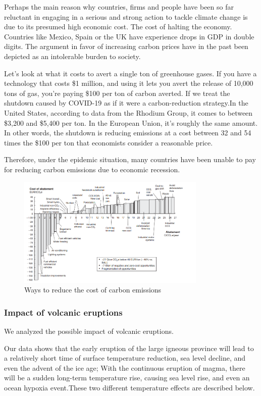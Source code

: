 \documentclass{apmcmthesis}
\begin{document}
Perhaps the main reason why countries, firms and people have been so far reluctant in engaging in a serious and strong action to tackle climate change is due to its presumed high economic cost. The cost of halting the economy. Countries like Mexico, Spain or the UK have experience drops in GDP in double digits. The argument in favor of increasing carbon prices have in the past been depicted as an intolerable burden to society. 

 Let’s look at what it costs to avert a single ton of greenhouse gases\cite{cost}. If you have a technology that costs \$1 million, and using it lets you avert the release of 10,000 tons of gas, you’re paying \$100 per ton of carbon averted. 
If we treat the shutdown caused by COVID-19 as if it were a carbon-reduction strategy.In the United States, according to data from the Rhodium Group, it comes to between \$3,200 and \$5,400 per ton. In the European Union, it’s roughly the same amount. In other words, the shutdown is reducing emissions at a cost between 32 and 54 times the \$100 per ton that economists consider a reasonable price.
 
 Therefore, under the epidemic situation, many countries have been unable to pay for reducing carbon emissions due to economic recession.
 
  \begin{figure} 
    \centering
    \includegraphics[width=9cm]{APMCMThesis/figures/cost.png}
    \caption{Ways to reduce the cost of carbon emissions}
\label{cost}
\end{figure}

 
\subsubsection{Impact of volcanic eruptions}
We analyzed the possible impact of volcanic eruptions.

Our data shows that the early eruption of the large igneous province will lead to a relatively short time of surface temperature reduction, sea level decline, and even the advent of the ice age; With the continuous eruption of magma, there will be a sudden long-term temperature rise, causing sea level rise, and even an ocean hypoxia event\cite{24}.These two different temperature effects are described below.
\end{document}
